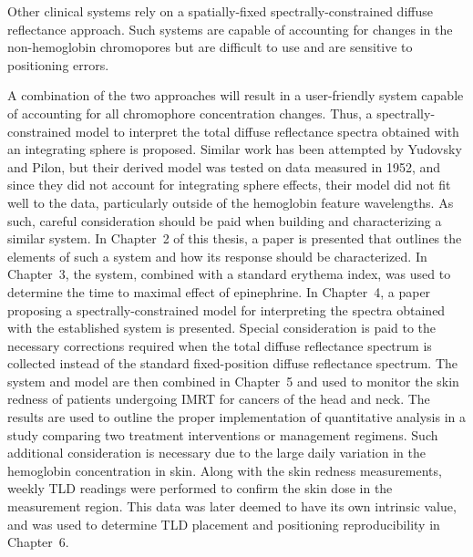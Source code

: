 Other clinical systems rely on a spatially-fixed spectrally-constrained diffuse reflectance approach. Such systems are capable of accounting for changes in the non-hemoglobin chromopores but are difficult to use and are sensitive to positioning errors.

A combination of the two approaches will result in a user-friendly system capable of accounting for all chromophore concentration changes. Thus, a spectrally-constrained model to interpret the total diffuse reflectance spectra obtained with an integrating sphere is proposed. Similar work has been attempted by Yudovsky and Pilon,\cite{Yudovsky2010a,Yudovsky2011} but their derived model was tested on data measured in 1952, and since they did not account for integrating sphere effects, their model did not fit well to the data, particularly outside of the hemoglobin feature wavelengths. As such, careful consideration should be paid when building and characterizing a similar system. In Chapter~2 of this thesis, a paper is presented that outlines the elements of such a system and how its response should be characterized. In Chapter~3, the system, combined with a standard erythema index, was used to determine the time to maximal effect of epinephrine. In Chapter~4, a paper proposing a spectrally-constrained model for interpreting the spectra obtained with the established system is presented. Special consideration is paid to the necessary corrections required when the total diffuse reflectance spectrum is collected instead of the standard fixed-position diffuse reflectance spectrum. The system and model are then combined in Chapter~5 and used to monitor the skin redness of patients undergoing IMRT for cancers of the head and neck. The results are used to outline the proper implementation of quantitative analysis in a study comparing two treatment interventions or management regimens. Such additional consideration is necessary due to the large daily variation in the hemoglobin concentration in skin. Along with the skin redness measurements, weekly TLD readings were performed to confirm the skin dose in the measurement region. This data was later deemed to have its own intrinsic value, and was used to determine TLD placement and positioning reproducibility in Chapter~6.